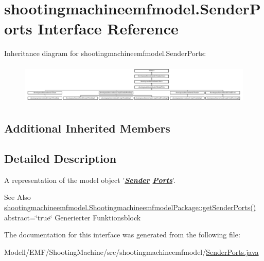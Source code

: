 \hypertarget{interfaceshootingmachineemfmodel_1_1_sender_ports}{\section{shootingmachineemfmodel.\-Sender\-Ports Interface Reference}
\label{interfaceshootingmachineemfmodel_1_1_sender_ports}
}
Inheritance diagram for shootingmachineemfmodel.\-Sender\-Ports\-:\begin{figure}[H]
\begin{center}
\leavevmode
\includegraphics[height=1.937716cm]{interfaceshootingmachineemfmodel_1_1_sender_ports}
\end{center}
\end{figure}
\subsection*{Additional Inherited Members}


\subsection{Detailed Description}
A representation of the model object '{\itshape {\bfseries \hyperlink{interfaceshootingmachineemfmodel_1_1_sender}{Sender} \hyperlink{interfaceshootingmachineemfmodel_1_1_ports}{Ports}}}'.

\begin{DoxySeeAlso}{See Also}
\hyperlink{interfaceshootingmachineemfmodel_1_1_shootingmachineemfmodel_package_a20b08c481a2cca0182c4bd0f15ab1475}{shootingmachineemfmodel.\-Shootingmachineemfmodel\-Package\-::get\-Sender\-Ports()}  abstract=\char`\"{}true\char`\"{} Generierter Funktionsblock 
\end{DoxySeeAlso}


The documentation for this interface was generated from the following file\-:\begin{DoxyCompactItemize}
\item 
Modell/\-E\-M\-F/\-Shooting\-Machine/src/shootingmachineemfmodel/\hyperlink{_sender_ports_8java}{Sender\-Ports.\-java}\end{DoxyCompactItemize}
